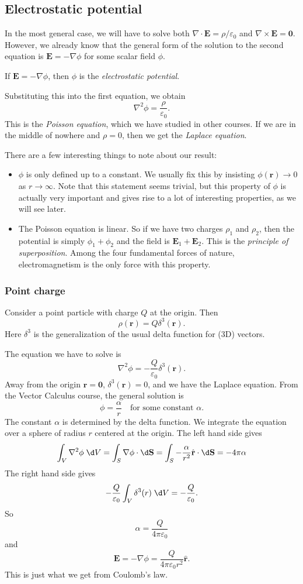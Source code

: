\documentclass[a4paper]{article}
\begin{document}
\subsection{Electrostatic potential}
In the most general case, we will have to solve both $\nabla \cdot \mathbf{E} = \rho/\varepsilon_0$ and $\nabla \times \mathbf{E} = \mathbf{0}$. However, we already know that the general form of the solution to the second equation is $\mathbf{E} = -\nabla\phi$ for some scalar field $\phi$.
\begin{defi}
  If $\mathbf{E} = -\nabla \phi$, then $\phi$ is the \emph{electrostatic potential}.
\end{defi}
Substituting this into the first equation, we obtain
\[
  \nabla^2\phi = \frac{\rho}{\varepsilon_0}.
\]
This is the \emph{Poisson equation}, which we have studied in other courses. If we are in the middle of nowhere and $\rho = 0$, then we get the \emph{Laplace equation}.

There are a few interesting things to note about our result:
\begin{itemize}
  \item $\phi$ is only defined up to a constant. We usually fix this by insisting $\phi(\mathbf{r}) \to 0$ as $r\to \infty$. Note that this statement seems trivial, but this property of $\phi$ is actually very important and gives rise to a lot of interesting properties, as we will see later.
  \item The Poisson equation is linear. So if we have two charges $\rho_1$ and $\rho_2$, then the potential is simply $\phi_1 + \phi_2$ and the field is $\mathbf{E}_1 + \mathbf{E}_2$. This is the \emph{principle of superposition}. Among the four fundamental forces of nature, electromagnetism is the only force with this property.
\end{itemize}
\subsubsection{Point charge}
Consider a point particle with charge $Q$ at the origin. Then
\[
  \rho (\mathbf{r}) = Q\delta^3(\mathbf{r}).
\]
Here $\delta^3$ is the generalization of the usual delta function for (3D) vectors.

The equation we have to solve is
\[
  \nabla^2\phi = -\frac{Q}{\varepsilon_0}\delta^3(\mathbf{r}).
\]
Away from the origin $\mathbf{r} = \mathbf{0}$, $\delta^3(\mathbf{r}) = 0$, and we have the Laplace equation. From the Vector Calculus course, the general solution is
\[
  \phi = \frac{\alpha}{r}\quad \text{for some constant }\alpha.
\]
The constant $\alpha$ is determined by the delta function. We integrate the equation over a sphere of radius $r$ centered at the origin. The left hand side gives
\[
  \int_V \nabla^2\phi\;\d V = \int_S \nabla\phi\cdot\d \mathbf{S} = \int_S -\frac{\alpha}{r^2} \hat{\mathbf{r}}\cdot \d \mathbf{S} = -4\pi\alpha
\]
The right hand side gives
\[
  -\frac{Q}{\varepsilon_0}\int_V\delta^3(r)\; \d V = -\frac{Q}{\varepsilon_0}.
\]
So
\[
  \alpha = \frac{Q}{4\pi \varepsilon_0}
\]
and
\[
  \mathbf{E} = -\nabla \phi = \frac{Q}{4\pi\varepsilon_0 r^2}\hat{\mathbf{r}}.
\]
This is just what we get from Coulomb's law.
\end{document}
